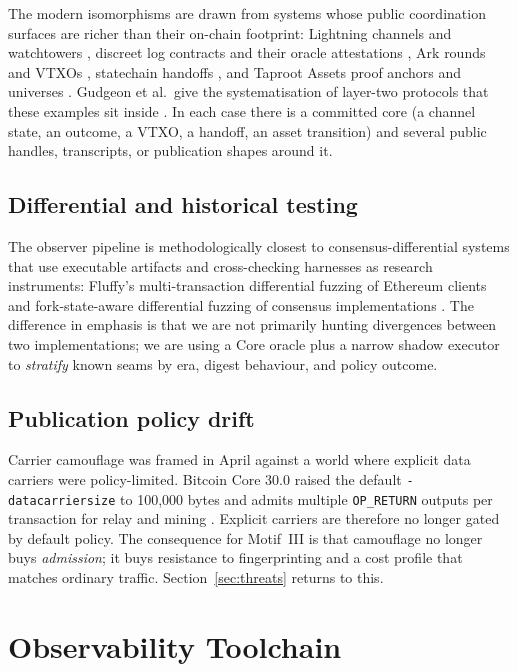 \documentclass[11pt]{article}
\begin{document}
The modern isomorphisms are drawn from systems whose public coordination
surfaces are richer than their on-chain footprint: Lightning channels and
watchtowers \cite{poon2016lightning,mccorry2019pisa}, discreet log contracts and
their oracle attestations \cite{dryja2017dlc}, Ark rounds and VTXOs
\cite{keceli2023ark}, statechain handoffs \cite{somsen2018statechains}, and
Taproot Assets proof anchors and universes \cite{osuntokun2022taprootassets}.
Gudgeon et al.\ give the systematisation of layer-two protocols that these
examples sit inside \cite{gudgeon2020sok}. In each case there is a committed
core (a channel state, an outcome, a VTXO, a handoff, an asset transition) and
several public handles, transcripts, or publication shapes around it.

\subsection{Differential and historical testing}

The observer pipeline is methodologically closest to consensus-differential
systems that use executable artifacts and cross-checking harnesses as research
instruments: Fluffy's multi-transaction differential fuzzing of Ethereum
clients and fork-state-aware differential fuzzing of consensus implementations
\cite{yang2021fluffy,kim2025fork}. The difference in emphasis is that we are
not primarily hunting divergences between two implementations; we are using a
Core oracle plus a narrow shadow executor to \emph{stratify} known seams by
era, digest behaviour, and policy outcome.

\subsection{Publication policy drift}
\label{sec:drift}

Carrier camouflage was framed in April against a world where explicit data
carriers were policy-limited. Bitcoin Core 30.0 raised the default
\texttt{-datacarriersize} to 100{,}000 bytes and admits multiple
\texttt{OP\_RETURN} outputs per transaction for relay and mining
\cite{bitcoincore30}. Explicit carriers are therefore no longer gated by
default policy. The consequence for Motif~III is that camouflage no longer buys
\emph{admission}; it buys resistance to fingerprinting and a cost profile that
matches ordinary traffic. Section~\ref{sec:threats} returns to this.

\section{Observability Toolchain}
\label{sec:toolchain}
\end{document}
